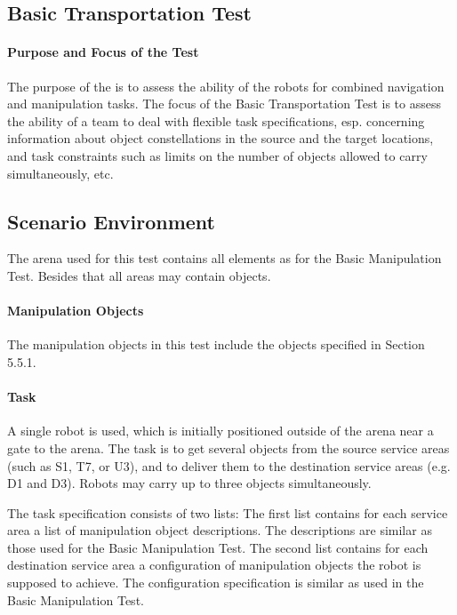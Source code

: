 \newpage
\subsection{Basic Transportation Test}

\paragraph{Purpose and Focus of the Test}
The purpose of the  is to assess the ability of the robots for combined navigation and manipulation tasks. 
The focus of the Basic Transportation Test is to assess the ability of a team to deal with flexible task specifications, esp. concerning information about object constellations in the source and the target locations, and task constraints such as limits on the number of objects allowed to carry simultaneously, etc.  

\subsection{Scenario Environment}
The arena used for this test contains all elements as for the Basic Manipulation Test. Besides that all areas may contain objects.

\paragraph{Manipulation Objects}
The manipulation objects in this test include the objects specified in Section 5.5.1.

\paragraph{Task}
A single robot is used, which is initially positioned outside of the arena near a gate to the arena. The task is to get several objects from the source service areas (such as S1, T7, or U3), and to deliver them to the destination service areas (e.g. D1 and D3). Robots may carry up to three objects simultaneously. 
\par
The task specification consists of two lists:
The first list contains for each service area a list of manipulation object descriptions. The descriptions are similar as those used for the Basic Manipulation Test. 
The second list contains for each destination service area a configuration of manipulation objects the robot is supposed to achieve. The configuration specification is similar as used in the Basic Manipulation Test. 

